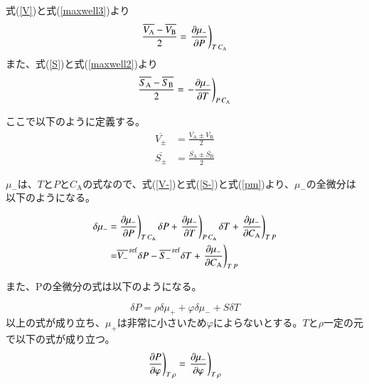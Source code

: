 \documentclass[a4paper,12pt, oneside, openany]{jsbook}
\begin{document}
\noindent
式(\ref{V})と式(\ref{maxwell3})より
\begin{equation}\label{V-}
   \frac{\overline{V_{\mathrm{A}}}-\overline{V_{\mathrm{B}}}}{2}=\left.\frac{\partial \mu_-}{\partial P}\right)_{T\hspace{0.5mm}C_\mathrm{A}}
\end{equation}
\noindent
また、式(\ref{S})と式(\ref{maxwell2})より
\begin{equation}\label{S-}
  \frac{\overline{S_{\mathrm{A}}}-\overline{S_{\mathrm{B}}}}{2}=\left.-\frac{\partial \mu_-}{\partial T}\right)_{P\hspace{0.5mm}C_\mathrm{A}}
\end{equation}


\noindent
ここで以下のように定義する。
\begin{equation}\label{pm}
\begin{split}
  \overline{V_\pm}&=\frac{\overline{V_{\mathrm{A}}}\pm\overline{V_{\mathrm{B}}}}{2} \\
  \overline{S_\pm}&=\frac{\overline{S_{\mathrm{A}}}\pm\overline{S_{\mathrm{B}}}}{2} 
\end{split}
\end{equation}

$\mu_-$は、$T$と$P$と$C_{\mathrm{A}}$の式なので、式(\ref{V-})と式(\ref{S-})と式(\ref{pm})より、$\mu_-$の全微分は以下のようになる。

\begin{equation}
\begin{split}
   \delta \mu_-=&\left.\frac{\partial \mu_-}{\partial P}\right)_{T\hspace{0.5mm}C_\mathrm{A}}\delta P+\left.\frac{\partial \mu_-}{\partial T}\right)_{P\hspace{0.5mm}C_\mathrm{A}}\delta T+\left.\frac{\partial \mu_-}{\partial C_\mathrm{A}}\right)_{T\hspace{0.5mm}P}\\
   =&\overline{V_-}^{\mathrm{\hspace{0.5mm}ref}}\delta P-\overline{S_-}^{\mathrm{\hspace{0.5mm}ref}}\delta T+\left.\frac{\partial \mu_-}{\partial C_\mathrm{A}}\right)_{T\hspace{0.5mm}P}
\end{split}
\end{equation}

また、Pの全微分の式は以下のようになる。

\begin{equation}
  \delta P=\rho\delta\mu_++\varphi\delta\mu_-+S\delta T
\end{equation}
以上の式が成り立ち、$\mu_+$は非常に小さいため$\varphi$によらないとする。$T$と$\rho$一定の元で以下の式が成り立つ。
\begin{equation}\label{P}
  \left.\frac{\partial P}{\partial \varphi}\right)_{T\hspace{0.5mm}\rho}=\left.\frac{\partial \mu_-}{\partial \varphi}\right)_{T\hspace{0.5mm}\rho}
\end{equation}
\end{document}
